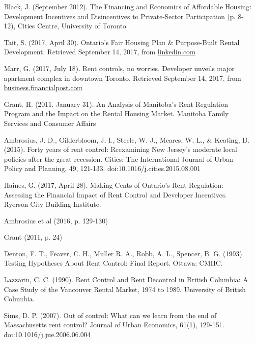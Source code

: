 \begin{thebibliography}{9}
  Black, J. (September 2012). The Financing and Economics of Affordable Housing: Development Incentives and Disincentives to Private-Sector Participation (p. 8-12), Cities Centre, University of Toronto

  Tait, S. (2017, April 30). Ontario’s Fair Housing Plan \& Purpose-Built Rental Development. Retrieved September 14, 2017, from \href{https://www.linkedin.com/pulse/ontarios-fair-housing-plan-purpose-built-rental-development-sean-tait/}{linkedin.com}

  Marr, G. (2017, July 18). Rent controls, no worries. Developer unveils major apartment complex in downtown Toronto. Retrieved September 14, 2017, from \href{http://business.financialpost.com/real-estate/property-post/one-of-the-best-assets-classes-major-landlord-expects-rental-apartment-demand-to-remain-strong-despite-rent-controls}{business.financialpost.com}

  Grant, H. (2011, January 31). An Analysis of Manitoba’s Rent Regulation Program and the Impact on the Rental Housing Market. Manitoba Family Services and Consumer Affairs

   Ambrosius, J. D., Gilderbloom, J. I., Steele, W. J., Meares, W. L., \& Keating, D. (2015). Forty years of rent control: Reexamining New Jersey’s moderate local policies after the great recession. Cities: The International Journal of Urban Policy and Planning, 49, 121-133. doi:10.1016/j.cities.2015.08.001

  Haines, G. (2017, April 28). Making Cents of Ontario’s Rent Regulation: Assessing the Financial Impact of Rent Control and Developer Incentives. Ryerson City Building Institute.

  Ambrosius et al (2016, p. 129-130)

  Grant (2011, p. 24)

  Denton, F. T., Feaver, C. H., Muller R. A., Robb, A. L., Spencer, B. G. (1993). Testing Hypotheses About Rent Control: Final Report. Ottawa: CMHC.

  Lazzarin, C. C. (1990). Rent Control and Rent Decontrol in British Columbia: A Case Study of the Vancouver Rental Market, 1974 to 1989. University of British Columbia.

  Sims, D. P. (2007). Out of control: What can we learn from the end of Massachusetts rent control? Journal of Urban Economics, 61(1), 129-151. doi:10.1016/j.jue.2006.06.004


\end{thebibliography}
